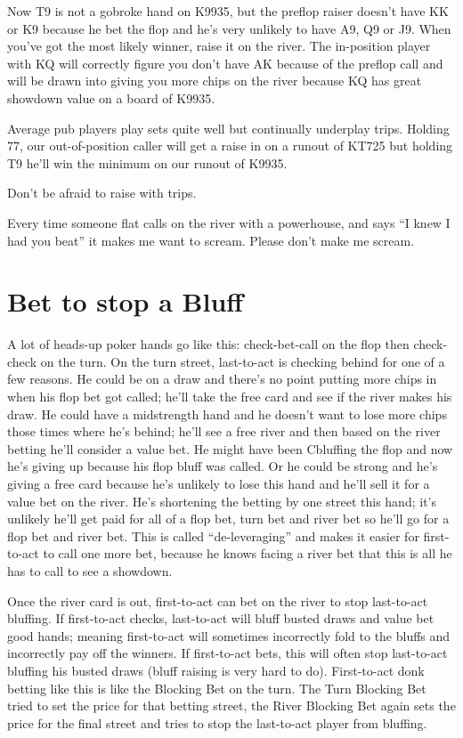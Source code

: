 Now T9 is not a gobroke hand on K9935, but the preflop raiser doesn't
have KK or K9 because he bet the flop and he's very unlikely to have
A9, Q9 or J9. When you've got the most likely winner, raise it on
the river. The in-position player with KQ will correctly figure you
don't have AK because of the preflop call and will be drawn into
giving you more chips on the river because KQ has great showdown value
on a board of K9935.

Average pub players play sets quite well but continually underplay
trips. Holding 77, our out-of-position caller will get a raise in on a
runout of KT725 but holding T9 he'll win the minimum on our runout of
K9935.

Don't be afraid to raise with trips.

Every time someone flat calls on the river with a powerhouse, and
says ``I knew I had you beat'' it makes me want to scream. Please
don't make me scream.

\section{Bet to stop a Bluff}

A lot of heads-up poker hands go like this: check-bet-call on the flop
then check-check on the turn. On the turn street, last-to-act
is checking behind for one of a few reasons. He could be on a draw
and there's no point putting more chips in when his flop bet got
called; he'll take the free card and see if the river makes his draw.
He could have a midstrength hand and he doesn't want to lose more chips
those times where he's behind; he'll see a free river and then based
on the river betting he'll consider a value bet. He might have been
Cbluffing the flop and now he's giving up because his flop bluff was
called. Or he could be strong and he's giving a free card because he's
unlikely to lose this hand and he'll sell it for a value bet on the
river. He's shortening the betting by one street this hand; it's
unlikely he'll get paid for all of a flop bet, turn bet and river bet
so he'll go for a flop bet and river bet. This is called
``de-leveraging'' and makes it easier for first-to-act to call one
more bet, because he knows facing a river bet that this is all he has
to call to see a showdown.

Once the river card is out, first-to-act can bet on the river
to stop last-to-act bluffing. If first-to-act checks, last-to-act
will bluff busted draws and value bet good hands; meaning first-to-act
will sometimes incorrectly fold to the bluffs and incorrectly pay
off the winners. If first-to-act bets, this will often
stop last-to-act bluffing his busted draws (bluff raising is
very hard to do). First-to-act donk betting like this is like
the Blocking Bet on the turn. The Turn Blocking Bet tried to set
the price for that betting street, the River Blocking Bet again
sets the price for the final street and tries to stop the
last-to-act player from bluffing.

